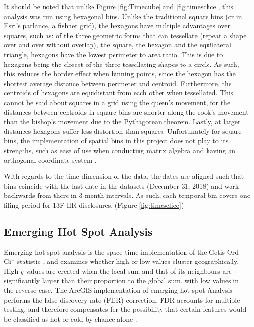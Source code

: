 It should be noted that unlike Figure \ref{fig:Timecube} and \ref{fig:timesclice}, this analysis was run using hexagonal bins. Unlike the traditional square bins (or in Esri's parlance, a fishnet grid), the hexagons have multiple advantages over squares, such as:  of the three geometric forms that can tessellate (repeat a shape over and over without overlap), the  square, the hexagon and the equilateral triangle, hexagons have the lowest perimeter to area ratio.  This is due to hexagons being the closest of the three tessellating shapes to a circle.  As such, this reduces the border effect when binning points, since the hexagon has the shortest average distance between perimeter and centroid.  Furthermore, the centroids of hexagons are equidistant from each other when tessellated.  This cannot be said about squares in a grid using the queen's movement, for the distances between centroids in square bins are shorter along the rook's movement than the bishop's movement due to the Pythagorean theorem.  Lastly, at larger distances hexagons suffer less distortion than squares.  Unfortunately for square bins, the implementation of spatial bins in this project does not play to its strengths, such as ease of use when conducting matrix algebra and having an orthogonal coordinate system \citep{birch2007rectangular}. 

With regards to the time dimension of the data, the dates are aligned such that bins coincide with the last date in the datasets (December 31, 2018) and work backwards from there in 3 month intervals.  As such, each temporal bin covers one filing period for 13F-HR disclosures.  (Figure \ref{fig:timesclice})

\subsection{Emerging Hot Spot Analysis}

Emerging hot spot analysis is the space-time implementation of the Getis-Ord Gi* statistic \citep{getis2010analysis}, and examines whether high or low values cluster geographically.  High $g$ values are created when the local sum and that of its neighbours are significantly larger than their proportion to the global sum, with low values in the reverse case. The ArcGIS implementation of emerging hot spot Analysis performs the false discovery rate (FDR) correction.  FDR accounts for multiple testing, and therefore compensates for the possibility that certain features would be classified as hot or cold by chance alone \citep{Esri}.

